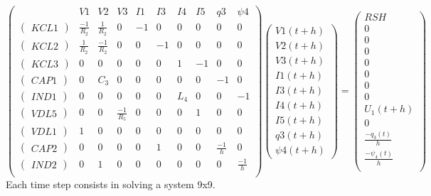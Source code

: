 \[\left(\begin{array}{ccccccccccc}
  &V1&V2&V3&I1&I3&I4&I5&q3&\psi 4\\
  \hline
  \left(\begin{array}{c} KCL1 \end{array}\right)&\frac{-1}{R_{2}}&\frac{1}{R_{2}}&0&-1&0&0&0&0&0\\
  \left(\begin{array}{c} KCL2 \end{array}\right)&\frac{1}{R_{2}}&\frac{-1}{R_{2}}&0&0&-1&0&0&0&0\\
  \left(\begin{array}{c} KCL3 \end{array}\right)&0&0&0&0&0&1&-1&0&0\\
  \left(\begin{array}{c} CAP1 \end{array}\right)&0&C_{3}&0&0&0&0&0&-1&0\\
  \left(\begin{array}{c} IND1 \end{array}\right)&0&0&0&0&0&L_{4}&0&0&-1\\
  \left(\begin{array}{c} VDL5 \end{array}\right)&0&0&\frac{-1}{R_{5}}&0&0&0&1&0&0\\
  \left(\begin{array}{c} VDL1 \end{array}\right)&1&0&0&0&0&0&0&0&0\\
  \left(\begin{array}{c} CAP2 \end{array}\right)&0&0&0&0&1&0&0&\frac{-1}{h}&0\\
  \left(\begin{array}{c} IND2 \end{array}\right)&0&1&0&0&0&0&0&0&\frac{-1}{h}\\
\end{array}\right) \left(\begin{array}{c}
 V1(t+h)\\
 V2(t+h)\\
 V3(t+h)\\
 I1(t+h)\\
 I3(t+h)\\
 I4(t+h)\\
 I5(t+h)\\
 q3(t+h)\\
 \psi 4(t+h)
  \end{array}\right)=
\left(\begin{array}{c}
  RSH\\
  \hline
  0\\
  0\\
  0\\
  0\\
  0\\
  0\\
  0\\
  U_{1}(t+h)\\
  0\\
  \frac{-q_{3}(t)}{h}\\
  \frac{-\psi_{4}(t)}{h}\\
\end{array}\right)\]
Each time step consists in solving a system 9x9.


